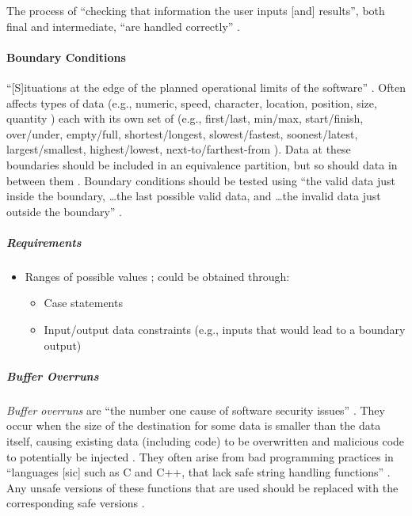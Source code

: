 The process of ``checking that information the user inputs [and] results'',
both final and intermediate, ``are handled correctly'' \cite[p.~70]{patton_software_2006}.

\paragraph{Boundary Conditions \cite[p.~70-74]{patton_software_2006}}

``[S]ituations at the edge of the planned operational limits of the software''
\cite[p.~72]{patton_software_2006}. Often affects types of data (e.g., numeric,
speed, character, location, position, size, quantity
\cite[p.~72]{patton_software_2006}) each with its own set of (e.g., first/last,
min/max, start/finish, over/under, empty/full, shortest/longest,
slowest/fastest, soonest/latest, largest/smallest, highest/lowest,
next-to/farthest-from \cite[p.~72-73]{patton_software_2006}). Data at these
boundaries should be included in an equivalence partition, but so should
data in between them \cite[p.~73]{patton_software_2006}. Boundary conditions
should be tested using ``the valid data just inside the boundary,
\dots the last possible valid data, and \dots the invalid data just outside the
boundary'' \cite[p.~73]{patton_software_2006}.

\subparagraph{Requirements}
\begin{itemize}
      \item Ranges of possible values \cite[p.~67, 73]{patton_software_2006};
            could be obtained through:
            \begin{itemize}
                  \item Case statements
                  \item Input/output data constraints (e.g., inputs that
                        would lead to a boundary output)
            \end{itemize}
\end{itemize}

\subparagraph{Buffer Overruns \cite[p.~201-205]{patton_software_2006}}

\emph{Buffer overruns} are ``the number one cause of software security issues''
\cite[p.~75]{patton_software_2006}. They occur when the size of the destination
for some data is smaller than the data itself, causing existing data (including
code) to be overwritten and malicious code to potentially be injected
\cite[p.~202, 204-205]{patton_software_2006}. They often arise from bad
programming practices in ``languages [sic] such as C and C++, that lack safe
string handling functions'' \cite[p.~201]{patton_software_2006}. Any unsafe
versions of these functions that are used should be replaced with the
corresponding safe versions \cite[p.~203-204]{patton_software_2006}.

